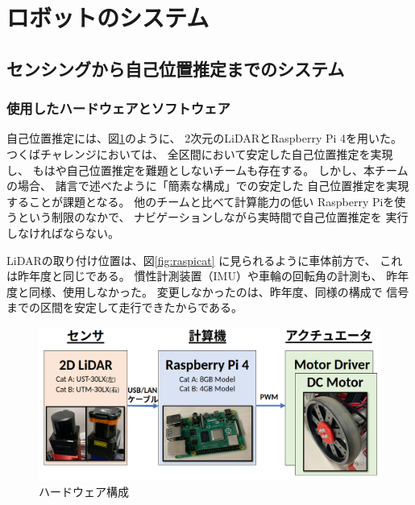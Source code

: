 \documentclass[twocolumn,9pt]{jsproceedings}
\begin{document}
\section{ロボットのシステム}

\subsection{センシングから自己位置推定までのシステム}

\subsubsection{使用したハードウェアとソフトウェア}


自己位置推定には、図\ref{fig:hardware}のように、
2次元のLiDARとRaspberry Pi 4を用いた。
つくばチャレンジにおいては、
全区間において安定した自己位置推定を実現し、
もはや自己位置推定を難題としないチームも存在する。
しかし、本チームの場合、
諸言で述べたように「簡素な構成」での安定した
自己位置推定を実現することが課題となる。
他のチームと比べて計算能力の低い
Raspberry Piを使うという制限のなかで、
ナビゲーションしながら実時間で自己位置推定を
実行しなければならない。


LiDARの取り付け位置は、図\ref{fig:raspicat}
に見られるように車体前方で、
これは昨年度\cite{池邉2021}と同じである。
慣性計測装置（IMU）や車輪の回転角の計測も、
昨年度と同様、使用しなかった。
変更しなかったのは、昨年度、同様の構成で
信号までの区間を安定して走行できたからである。

\begin{figure}[h]
  \begin{center}
    \includegraphics[width=1.0\linewidth]{figs/hardware.pdf}
    \caption{ハードウェア構成}
    \label{fig:hardware}
  \end{center}
\end{figure}
\end{document}
